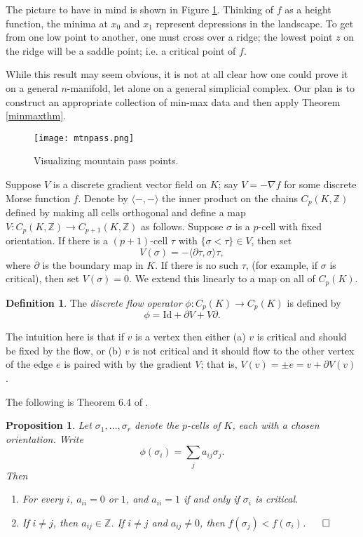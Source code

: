 \documentclass[11pt]{amsart}
\newtheorem{proposition}[theorem]{Proposition}
\theoremstyle{definition}
\newtheorem{definition}[theorem]{Definition}
\newcommand{\zz}{{\mathbb Z}}
\begin{document}
The picture to have in mind is shown in Figure \ref{mountainpassfig}. Thinking of $f$ as a height function, the minima at $x_0$ and $x_1$ represent depressions in the landscape. To get from one low point to another, one must cross over a ridge; the lowest point $z$ on the ridge will be a saddle point; i.e. a critical point of $f$.

While this result may seem obvious, it is not at all clear how one could prove it on a general $n$-manifold, let alone on a general simplicial complex. Our plan is to construct an appropriate collection of min-max data and then apply Theorem \ref{minmaxthm}.

\begin{figure}
\centerline{\texttt{[image: mtnpass.png]}}
\caption{\label{mountainpassfig} Visualizing mountain pass points.}
\end{figure}


Suppose $V$ is a discrete gradient vector field on $K$; say $V = -\nabla f$ for some discrete Morse function $f$. Denote by $\langle - , - \rangle$ the inner product on the chains $C_p(K,\zz)$ defined by making all cells orthogonal and define a map $V: C_p(K,\mathbb{Z} )\rightarrow C_{p+1}(K,\mathbb{Z})$ as follows. Suppose $\sigma$ is a $p$-cell with fixed orientation. If there is a $(p+1)$-cell $\tau$ with $\{\sigma <\tau \}\in V$, then set $$V(\sigma )= -\langle\partial\tau , \sigma \rangle\tau,$$ where $\partial$ is the boundary map in $K$. If there is no such $\tau$, (for example, if $\sigma$ is critical), then set $V(\sigma ) = 0$. We extend this linearly to a map on all of $C_p(K)$.  



\begin{definition} The {\em discrete flow operator} $\phi:C_p(K)\to C_p(K)$  is defined by $$\phi =\text{Id} + \partial V + V\partial.$$
\end{definition}

The intuition here is that if $v$ is a vertex then either (a) $v$ is critical and should be fixed by the flow, or (b) $v$ is not critical and it should flow to the other vertex of the edge $e$ is paired with by the gradient $V$; that is, $V(v) = \pm e = v + \partial V(v)$.

The following is Theorem 6.4 of \cite{forman}.

\begin{proposition}\label{flowgoesdown} Let $\sigma_1,\dots,\sigma_r$ denote the $p$-cells of $K$, each with a chosen orientation. Write $$\phi(\sigma_i) = \sum_j a_{ij}\sigma_j.$$ Then
\begin{enumerate}
\item For every $i$, $a_{ii}=0$ or $1$, and $a_{ii}=1$ if and only if $\sigma_i$ is critical.
\item If $i\ne j$, then $a_{ij}\in\zz$. If $i\ne j$ and $a_{ij}\ne 0$, then $f(\sigma_j)<f(\sigma_i)$. \hfill $\qed$
\end{enumerate}
\end{proposition}
\end{document}
